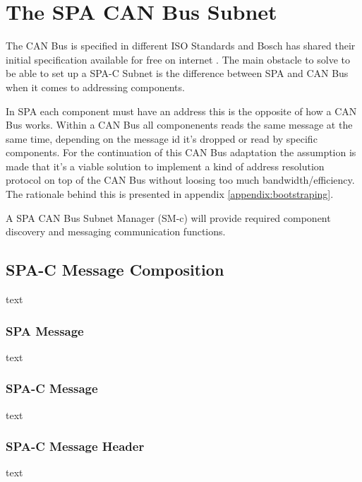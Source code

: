 \section{The SPA CAN Bus Subnet}\label{ch:spa_can_bus_subnet}
The CAN Bus is specified in different ISO Standards and Bosch has shared their
initial specification available for free on internet \cite{standard:can_bus}.
The main obstacle to solve to be able to set up a SPA-C Subnet is the difference
between SPA and CAN Bus when it comes to addressing components.

In SPA each component must have an address this is the opposite of how a
CAN Bus works. Within a CAN Bus all componenents reads the same message
at the same time, depending on the message id it's dropped or read by specific
components. For the continuation of this CAN Bus adaptation the assumption is
made that it's a viable solution to implement a kind of address resolution
protocol on top of the CAN Bus without loosing too much bandwidth/efficiency.
The rationale behind this is presented in appendix \ref{appendix:bootstraping}.

A SPA CAN Bus Subnet Manager (SM-c) will provide required component discovery
and messaging communication functions.

\subsection{SPA-C Message Composition}
text




\subsubsection{SPA Message}
text
\subsubsection{SPA-C Message}
text
\subsubsection{SPA-C Message Header}
text
